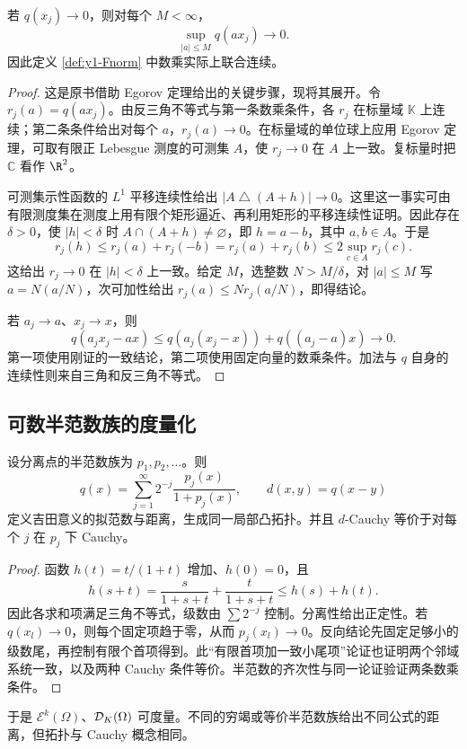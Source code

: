 \begin{lemma}\label{lem:y1-uniform-scalars}
若 $q(x_j)\to0$，则对每个 $M<\infty$，
\[
 \sup_{|a|\le M}q(ax_j)\longrightarrow0.
\]
因此定义 \ref{def:y1-Fnorm} 中数乘实际上联合连续。
\end{lemma}
\begin{proof}
这是原书借助 Egorov 定理给出的关键步骤，现将其展开。令 $r_j(a)=q(ax_j)$。由反三角不等式与第一条数乘条件，各 $r_j$ 在标量域 $\mathbb K$ 上连续；第二条条件给出对每个 $a$，$r_j(a)\to0$。在标量域的单位球上应用 Egorov 定理，可取有限正 Lebesgue 测度的可测集 $A$，使 $r_j\to0$ 在 $A$ 上一致。复标量时把 $\mathbb{C}$ 看作 $\R^2$。

可测集示性函数的 $L^1$ 平移连续性给出 $|A\mathbin\triangle(A+h)|\to0$。这里这一事实可由有限测度集在测度上用有限个矩形逼近、再利用矩形的平移连续性证明。因此存在 $\delta>0$，使 $|h|<\delta$ 时 $A\cap(A+h)\ne\varnothing$，即 $h=a-b$，其中 $a,b\in A$。于是
\[
 r_j(h)\le r_j(a)+r_j(-b)=r_j(a)+r_j(b)
 \le2\sup_{c\in A}r_j(c).
\]
这给出 $r_j\to0$ 在 $|h|<\delta$ 上一致。给定 $M$，选整数 $N>M/\delta$，对 $|a|\le M$ 写 $a=N(a/N)$，次可加性给出 $r_j(a)\le Nr_j(a/N)$，即得结论。

若 $a_j\to a$、$x_j\to x$，则
\[
 q(a_jx_j-ax)\le q(a_j(x_j-x))+q((a_j-a)x)\to0.
\]
第一项使用刚证的一致结论，第二项使用固定向量的数乘条件。加法与 $q$ 自身的连续性则来自三角和反三角不等式。
\end{proof}

\subsection{可数半范数族的度量化}
\begin{theorem}[可数半范数族与平移不变距离]\label{thm:y1-countable-metric}
设分离点的半范数族为 $p_1,p_2,\ldots$。则
\[
 q(x)=\sum_{j=1}^\infty2^{-j}\frac{p_j(x)}{1+p_j(x)},\qquad d(x,y)=q(x-y)
\]
定义吉田意义的拟范数与距离，生成同一局部凸拓扑。并且 $d$-Cauchy 等价于对每个 $j$ 在 $p_j$ 下 Cauchy。
\end{theorem}
\begin{proof}
函数 $h(t)=t/(1+t)$ 增加、$h(0)=0$，且
\[
 h(s+t)=\frac{s}{1+s+t}+\frac{t}{1+s+t}\le h(s)+h(t).
\]
因此各求和项满足三角不等式，级数由 $\sum2^{-j}$ 控制。分离性给出正定性。若 $q(x_l)\to0$，则每个固定项趋于零，从而 $p_j(x_l)\to0$。反向结论先固定足够小的级数尾，再控制有限个首项得到。此“有限首项加一致小尾项”论证也证明两个邻域系统一致，以及两种 Cauchy 条件等价。半范数的齐次性与同一论证验证两条数乘条件。
\end{proof}
于是 $\mathcal E^k(\Omega)$、$\mathcal{D}_K(\Omega)$ 可度量。不同的穷竭或等价半范数族给出不同公式的距离，但拓扑与 Cauchy 概念相同。

